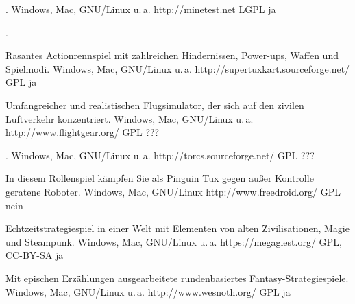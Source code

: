 



{.}
{Windows, Mac, GNU/Linux u.\,a.}
{http://minetest.net}
{LGPL}
{ja}

{.}
{} 
{}
{}
{}

{Rasantes Actionrennspiel mit zahlreichen Hindernissen, Power-ups, Waffen und Spielmodi.}
{Windows, Mac, GNU/Linux u.\,a.}
{http://supertuxkart.sourceforge.net/}
{GPL}
{ja}

{Umfangreicher und realistischen Flugsimulator, der sich auf den zivilen Luftverkehr konzentriert.}
{Windows, Mac, GNU/Linux u.\,a.}
{http://www.flightgear.org/}
{GPL}
{???}

{.}
{Windows, Mac, GNU/Linux u.\,a.}
{http://torcs.sourceforge.net/}
{GPL}
{???}


{In diesem Rollenspiel kämpfen Sie als Pinguin Tux gegen außer Kontrolle geratene Roboter.}
{Windows, Mac, GNU/Linux}
{http://www.freedroid.org/}
{GPL}
{nein}

{Echtzeitstrategiespiel in einer Welt mit Elementen von alten Zivilisationen, Magie und Steampunk.}
{Windows, Mac, GNU/Linux u.\,a.}
{https://megaglest.org/}
{GPL, CC-BY-SA}
{ja}

{Mit epischen Erzählungen ausgearbeitete rundenbasiertes Fantasy-Strategiespiele.}
{Windows, Mac, GNU/Linux u.\,a.}
{http://www.wesnoth.org/}
{GPL}
{ja}

\backpage


